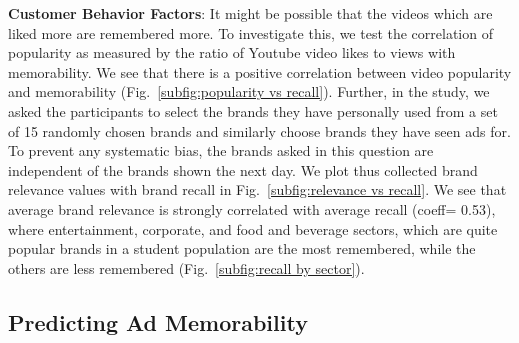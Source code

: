 

\textbf{Customer Behavior Factors}: It might be possible that the videos which are liked more are remembered more. To investigate this, we test the correlation of popularity as measured by the ratio of Youtube video likes to views with memorability. We see that there is a positive correlation between video popularity and memorability (Fig.~\ref{subfig:popularity vs recall}). Further, in the study, we asked the participants to select the brands they have personally used from a set of 15 randomly chosen brands and similarly choose brands they have seen ads for. To prevent any systematic bias, the brands asked in this question are independent of the brands shown the next day. We plot thus collected brand relevance values with brand recall in Fig.~\ref{subfig:relevance vs recall}. We see that average brand relevance is strongly correlated with average recall (coeff= 0.53), where entertainment, corporate, and food and beverage sectors, which are quite popular brands in a student population are the most remembered, while the others are less remembered (Fig.~\ref{subfig:recall by sector}).


\subsection{Predicting Ad Memorability}
\label{sec:Predicting Ad Memorability}


